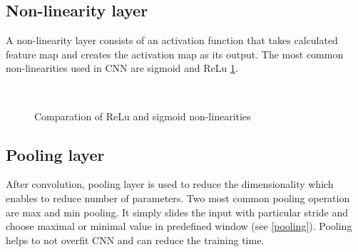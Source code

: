\documentclass[twoside]{ctuthesis}
\theoremstyle{plain}
\theoremstyle{definition}
\theoremstyle{note}
\begin{document}
\subsection{Non-linearity layer}

A non-linearity layer consists of an activation function that takes calculated feature map and creates the activation map as its output. The most common non-linearities used in CNN are sigmoid and ReLu \ref{non-linearity}.

\begin{figure}[h]
\\
\caption{Comparation of ReLu and sigmoid non-linearities}
\label{non-linearity}
\end{figure}
\subsection{Pooling layer}

After convolution, pooling layer is used to reduce the dimensionality which enables to reduce number of parameters. Two most common pooling operation are max and min pooling. It simply slides the input with particular stride and choose maximal or minimal value in predefined window (see \ref{pooling}). Pooling helps to not overfit CNN and can reduce the training time.
\end{document}
